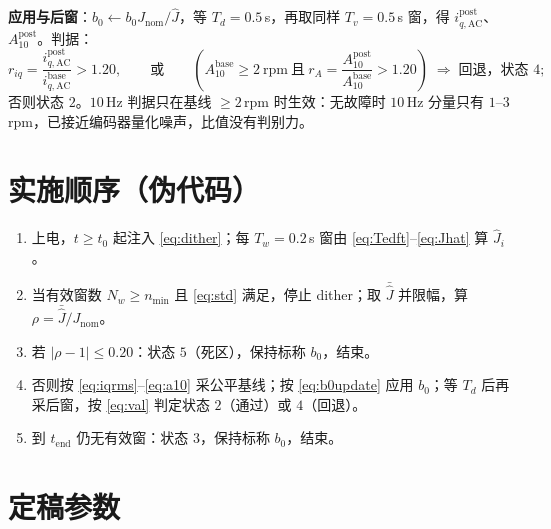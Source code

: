 \documentclass[11pt,a4paper]{article}
\newcommand{\Jnom}{J_{\mathrm{nom}}}
\newcommand{\Jhat}{\hat J}
\newcommand{\bzero}{b_0}
\newcommand{\rpm}{\mathrm{rpm}}
\begin{document}
\textbf{应用与后窗}：$\bzero\leftarrow\bzero\Jnom/\Jhat$，等 $T_d=0.5$\,s，再取同样 $T_v=0.5$\,s 窗，得 $i_{q,\mathrm{AC}}^{\mathrm{post}}$、$A_{10}^{\mathrm{post}}$。判据：
\begin{equation}
r_{iq}=\frac{i_{q,\mathrm{AC}}^{\mathrm{post}}}{i_{q,\mathrm{AC}}^{\mathrm{base}}}>1.20,
\qquad\text{或}\qquad
\left(A_{10}^{\mathrm{base}}\ge2\ \rpm\ \text{且}\ r_{A}=\frac{A_{10}^{\mathrm{post}}}{A_{10}^{\mathrm{base}}}>1.20\right)
\;\Longrightarrow\;\text{回退，状态 }4;
\label{eq:val}
\end{equation}
否则状态 $2$。$10$\,Hz 判据只在基线 $\ge2$\,rpm 时生效：无故障时 $10$\,Hz 分量只有 $1$--$3$\,rpm，已接近编码器量化噪声，比值没有判别力。

\section*{实施顺序（伪代码）}
\begin{enumerate}
  \item 上电，$t\ge t_0$ 起注入 \eqref{eq:dither}；每 $T_w=0.2$\,s 窗由 \eqref{eq:Tedft}--\eqref{eq:Jhat} 算 $\Jhat_i$。
  \item 当有效窗数 $N_w\ge n_{\min}$ 且 \eqref{eq:std} 满足，停止 dither；取 $\bar{\Jhat}$ 并限幅，算 $\rho=\bar{\Jhat}/\Jnom$。
  \item 若 $|\rho-1|\le0.20$：状态 $5$（死区），保持标称 $\bzero$，结束。
  \item 否则按 \eqref{eq:iqrms}--\eqref{eq:a10} 采公平基线；按 \eqref{eq:b0update} 应用 $\bzero$；等 $T_d$ 后再采后窗，按 \eqref{eq:val} 判定状态 $2$（通过）或 $4$（回退）。
  \item 到 $t_{\mathrm{end}}$ 仍无有效窗：状态 $3$，保持标称 $\bzero$，结束。
\end{enumerate}

\section{定稿参数}
\end{document}
